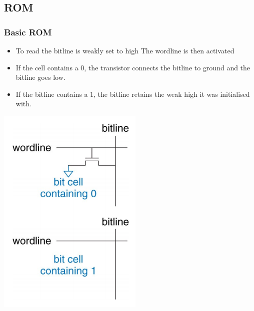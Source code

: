 \documentclass{article}[18pt]
\begin{document}
\subsection{ROM}
\subsubsection{Basic ROM}
\begin{itemize}
	\item To read the bitline is weakly set to high
	The wordline is then activated 
	\item If the cell contains a 0, the transistor
	connects the bitline to ground and the
	bitline goes low. 
	\item If the bitline contains a 1, the bitline retains
	the weak high it was initialised with.
\end{itemize}
\begin{center}
	\includegraphics[scale=0.7]{basic_rom}
\end{center}
\end{document}
